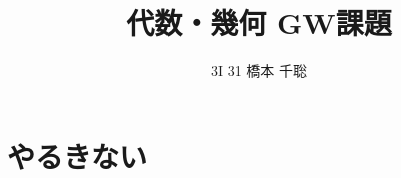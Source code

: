 \documentclass[a4paper,11pt]{jsarticle}
\title{代数・幾何 GW課題}
\author{3I 31 橋本 千聡}
\begin{document}
\maketitle
\section*{やるきない}
\end{document}
